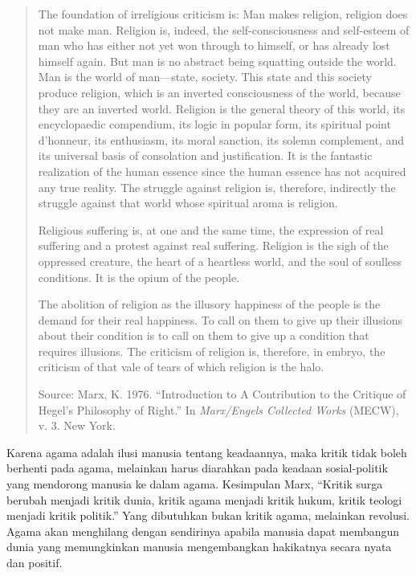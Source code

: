 \documentclass[11pt,twoside,a5paper,openany]{memoir}
\begin{document}
\begin{quote}
The foundation of irreligious criticism is: Man makes religion, religion
does not make man. Religion is, indeed, the self-consciousness and
self-esteem of man who has either not yet won through to himself, or has
already lost himself again. But man is no abstract being squatting
outside the world. Man is the world of man---state, society. This state
and this society produce religion, which is an inverted consciousness of
the world, because they are an inverted world. Religion is the general
theory of this world, its encyclopaedic compendium, its logic in popular
form, its spiritual point d'honneur, its enthusiasm, its moral sanction,
its solemn complement, and its universal basis of consolation and
justification. It is the fantastic realization of the human essence
since the human essence has not acquired any true reality. The struggle
against religion is, therefore, indirectly the struggle against that
world whose spiritual aroma is religion.

Religious suffering is, at one and the same time, the expression of real
suffering and a protest against real suffering. Religion is the sigh of
the oppressed creature, the heart of a heartless world, and the soul of
soulless conditions. It is the opium of the people.

The abolition of religion as the illusory happiness of the people is the
demand for their real happiness. To call on them to give up their
illusions about their condition is to call on them to give up a
condition that requires illusions. The criticism of religion is,
therefore, in embryo, the criticism of that vale of tears of which
religion is the halo.

Source: Marx, K. 1976. ``Introduction to A Contribution to the Critique
of Hegel's Philosophy of Right.'' In \emph{Marx/Engels Collected Works}
(MECW), v. 3. New York.
\end{quote}

Karena agama adalah ilusi manusia tentang keadaannya, maka kritik tidak
boleh berhenti pada agama, melainkan harus diarahkan pada keadaan
sosial-politik yang mendorong manusia ke dalam agama. Kesimpulan Marx,
``Kritik surga berubah menjadi kritik dunia, kritik agama menjadi kritik
hukum, kritik teologi menjadi kritik politik.'' Yang dibutuhkan bukan
kritik agama, melainkan revolusi. Agama akan menghilang dengan
sendirinya apabila manusia dapat membangun dunia yang memungkinkan
manusia mengembangkan hakikatnya secara nyata dan positif.
\end{document}
